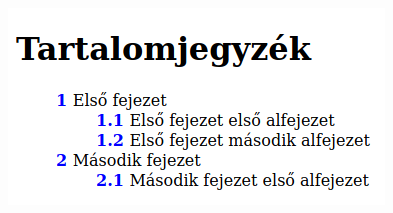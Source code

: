 \begin{frame}
  \begin{columns}[c]
      \begin{exampleblock}{}
        \scriptsize
        
      \end{exampleblock}
      \begin{exampleblock}{}
        \scriptsize
        
      \end{exampleblock}
  \end{columns}
\end{frame}

\begin{frame}
  \begin{center}
    \includegraphics[width=.5\textwidth]{szamozottLista.png}\\
  \end{center}
\end{frame}

